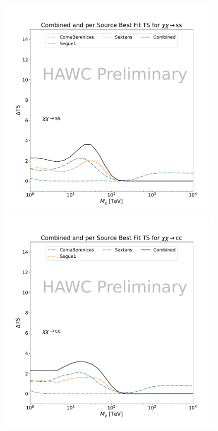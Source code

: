 \begin{figure}[h]
{    \includegraphics[scale=0.21]{figures/mtd_hawc_dm/results/CombinedTS_New_duck_ss_.pdf}
    \includegraphics[scale=0.21]{figures/mtd_hawc_dm/results/CombinedTS_New_duck_cc_.pdf}
}
\end{figure}
